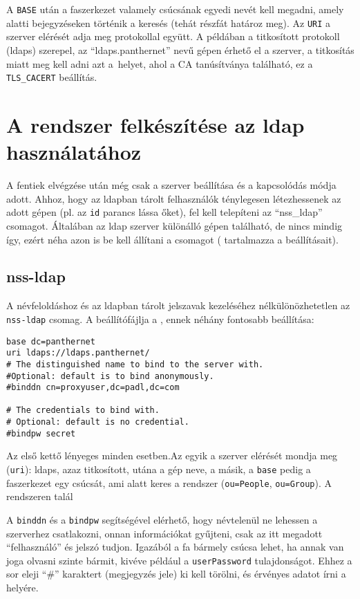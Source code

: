 A \texttt{BASE} után a faszerkezet valamely csúcsának egyedi nevét kell megadni, amely alatti bejegyzéseken történik a
keresés (tehát részfát határoz meg). Az \texttt{URI} a szerver elérését adja meg protokollal együtt. A példában
a titkosított protokoll (ldaps) szerepel, az ``ldaps.panthernet'' nevű gépen érhető el a szerver, a titkosítás miatt meg
kell adni azt a~helyet, ahol a CA tanúsítványa található, ez a \texttt{TLS\_CACERT} beállítás.

\section{A rendszer felkészítése az ldap használatához}
A fentiek elvégzése után még csak a szerver beállítása és a kapcsolódás módja adott. Ahhoz, hogy az ldapban tárolt
felhasználók ténylegesen létezhessenek az adott gépen (pl. az \texttt{id} parancs lássa őket), fel kell telepíteni 
az ``nss\_ldap'' csomagot. Általában az ldap
szerver különálló gépen található, de nincs mindig így, ezért néha azon is be kell állítani a csomagot
( tartalmazza a beállításait).

\subsection{nss-ldap}
A névfeloldáshoz és az ldapban tárolt jelszavak kezeléséhez nélkülönözhetetlen az \texttt{nss-ldap} csomag. A
beállítófájlja a , ennek néhány fontosabb beállítása:

\begin{Verbatim}[frame=single,label=/etc/ldap.conf részlet]
base dc=panthernet
uri ldaps://ldaps.panthernet/
# The distinguished name to bind to the server with.
#Optional: default is to bind anonymously.
#binddn cn=proxyuser,dc=padl,dc=com
  
# The credentials to bind with.
# Optional: default is no credential.
#bindpw secret
\end{Verbatim}

Az első kettő lényeges minden esetben.Az egyik a szerver elérését mondja meg (\texttt{uri}): ldaps, azaz titkosított,
utána a gép neve, a másik, a \texttt{base} pedig a faszerkezet egy csúcsát, ami alatt keres a rendszer
(\texttt{ou=People}, \texttt{ou=Group}). A rendszeren talál

A \texttt{binddn} és a \texttt{bindpw} segítségével elérhető, hogy névtelenül ne lehessen a szerverhez csatlakozni,
onnan információkat gyűjteni, csak az itt megadott ``felhasználó'' és jelszó tudjon. Igazából a fa bármely csúcsa
lehet, ha annak van joga olvasni szinte bármit, kivéve például a \texttt{userPassword} tulajdonságot. Ehhez a sor
eleji ``\#'' karaktert (megjegyzés jele) ki kell törölni, és érvényes adatot írni a helyére.

